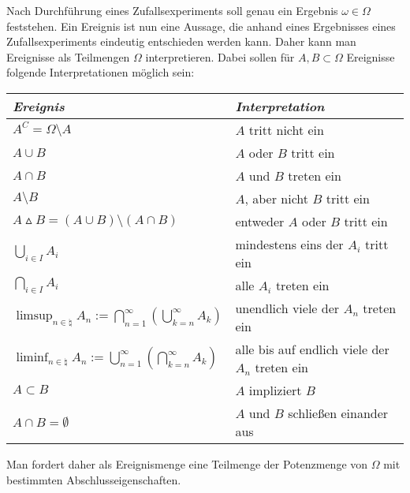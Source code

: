 \begin{Bem}
    Nach Durchführung eines Zufallsexperiments soll genau ein Ergebnis $\omega \in \Omega$
    feststehen.
    Ein Ereignis ist nun eine Aussage, die anhand eines Ergebnisses eines Zufallsexperiments
    eindeutig entschieden werden kann.
    Daher kann man Ereignisse als Teilmengen $\Omega$ interpretieren.
    Dabei sollen für $A, B \subset \Omega$ Ereignisse folgende Interpretationen möglich sein:

    \begin{tabular}{p{60mm}p{100mm}}
        \toprule
        \emph{Ereignis} &
        \emph{Interpretation}\\

        \midrule

        $A^C = \Omega \setminus A$ &
        $A$ tritt nicht ein \\

        $A \cup B$ &
        $A$ oder $B$ tritt ein \\

        $A \cap B$ &
        $A$ und $B$ treten ein \\

        $A \setminus B$ &
        $A$, aber nicht $B$ tritt ein \\

        $A \vartriangle B = (A \cup B) \setminus (A \cap B)$ &
        entweder $A$ oder $B$ tritt ein \\

        $\bigcup_{i \in I} A_i$ &
        mindestens eins der $A_i$ tritt ein \\

        $\bigcap_{i \in I} A_i$ &
        alle $A_i$ treten ein \\

        $\limsup_{n \in \natural} A_n :=
        \bigcap_{n=1}^\infty \left(\bigcup_{k=n}^\infty A_k\right)$ &
        unendlich viele der $A_n$ treten ein \\

        $\liminf_{n \in \natural} A_n :=
        \bigcup_{n=1}^\infty \left(\bigcap_{k=n}^\infty A_k\right)$ &
        alle bis auf endlich viele der $A_n$ treten ein \\

        $A \subset B$ &
        $A$ impliziert $B$ \\

        $A \cap B = \emptyset$ &
        $A$ und $B$ schließen einander aus \\

        \bottomrule
    \end{tabular}

    Man fordert daher als Ereignismenge eine Teilmenge der Potenzmenge von $\Omega$ mit bestimmten
    Abschlusseigenschaften.
\end{Bem}

